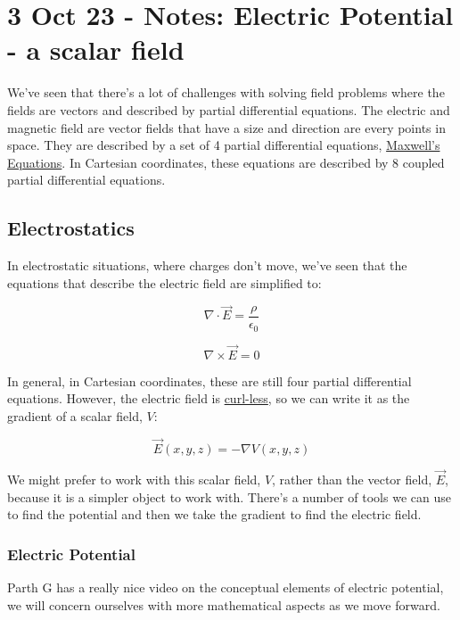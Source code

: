 \section{3 Oct 23 - Notes: Electric Potential - a scalar
field}\label{oct-23---notes-electric-potential---a-scalar-field}

We've seen that there's a lot of challenges with solving field problems
where the fields are vectors and described by partial differential
equations. The electric and magnetic field are vector fields that have a
size and direction are every points in space. They are described by a
set of 4 partial differential equations,
\href{https://en.wikipedia.org/wiki/Maxwell\%27s_equations}{Maxwell's
Equations}. In Cartesian coordinates, these equations are described by 8
coupled partial differential equations.

\subsection{Electrostatics}\label{electrostatics}

In electrostatic situations, where charges don't move, we've seen that
the equations that describe the electric field are simplified to:

\[\nabla \cdot \vec{E} = \frac{\rho}{\epsilon_0}\]

\[\nabla \times \vec{E} = 0\]

In general, in Cartesian coordinates, these are still four partial
differential equations. However, the electric field is
\href{https://en.wikipedia.org/wiki/Curl_(mathematics)}{curl-less}, so
we can write it as the gradient of a scalar field, \(V\):

\[\vec{E}(x,y,z) = -\nabla V(x,y,z)\]

We might prefer to work with this scalar field, \(V\), rather than the
vector field, \(\vec{E}\), because it is a simpler object to work with.
There's a number of tools we can use to find the potential and then we
take the gradient to find the electric field.

\subsubsection{Electric Potential}\label{electric-potential}

Parth G has a really nice video on the conceptual elements of electric
potential, we will concern ourselves with more mathematical aspects as
we move forward.

\href{https://inv.tux.pizza/watch?v=7rjAtuwxrEA}{\pandocbounded{\texttt{[image: https://markdown-videos-api.jorgenkh.no/youtube/7rjAtuwxrEA?width=720\&height=405]}}}

